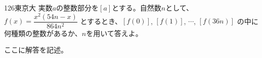 \begin{prob}{126}{}{東京大}
 実数$a$の整数部分を$[a]$とする。自然数$n$として、$f(x)=\dfrac{x^2(54n-x)}{864n^2}$ とするとき、$[f(0)]$, $[f(1)]$, $\cdots$, $[f(36n)]$ の中に何種類の整数があるか、$n$を用いて答えよ。
\end{prob}
ここに解答を記述。